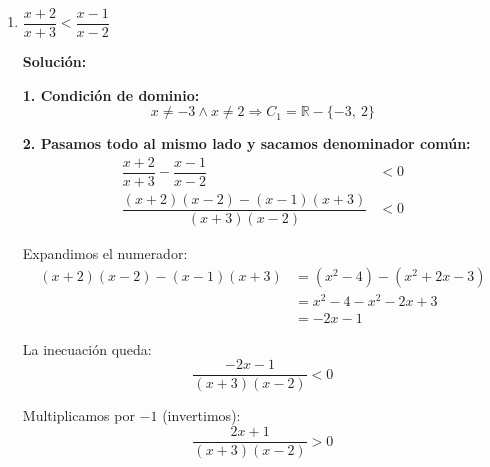 \documentclass[12pt]{article}
\newcommand{\solucion}{%
    \vspace{0.8em}%
    \textbf{Solución:}%
}
\begin{document}
\begin{enumerate}[label=\alph*.-]
    \textbf{5.} $C_2 = [-2, 0) \cup (1, 3]$ \quad (incluimos raíces del numerador, excluimos las del denominador)

    \textbf{6.} $CS = C_1 \cap C_2 = (\mathbb{R} - \{0,1\}) \cap ([-2,0) \cup (1,3])$
    \[
    \boxed{CS = [-2,\ 0) \cup (1,\ 3]}
    \]

    \textbf{Representación gráfica:}

    \begin{center}
    \end{center}

    \newpage
    \item $\dfrac{x+2}{x+3} < \dfrac{x-1}{x-2}$

    \solucion

    \textbf{1. Condición de dominio:}
    \[
    x \neq -3 \land x \neq 2 \Rightarrow C_1 = \mathbb{R} - \{-3,\ 2\}
    \]

    \textbf{2. Pasamos todo al mismo lado y sacamos denominador común:}
    \begin{align*}
    \dfrac{x+2}{x+3} - \dfrac{x-1}{x-2} &< 0 \\[0.3em]
    \dfrac{(x+2)(x-2) - (x-1)(x+3)}{(x+3)(x-2)} &< 0
    \end{align*}

    Expandimos el numerador:
    \begin{align*}
    (x+2)(x-2) - (x-1)(x+3) &= (x^2 - 4) - (x^2 + 2x - 3) \\[0.3em]
    &= x^2 - 4 - x^2 - 2x + 3 \\[0.3em]
    &= -2x - 1
    \end{align*}

    La inecuación queda:
    \[
    \dfrac{-2x-1}{(x+3)(x-2)} < 0
    \]

    Multiplicamos por $-1$ (invertimos):
    \[
    \dfrac{2x+1}{(x+3)(x-2)} > 0
    \]


\end{enumerate}
\end{document}
